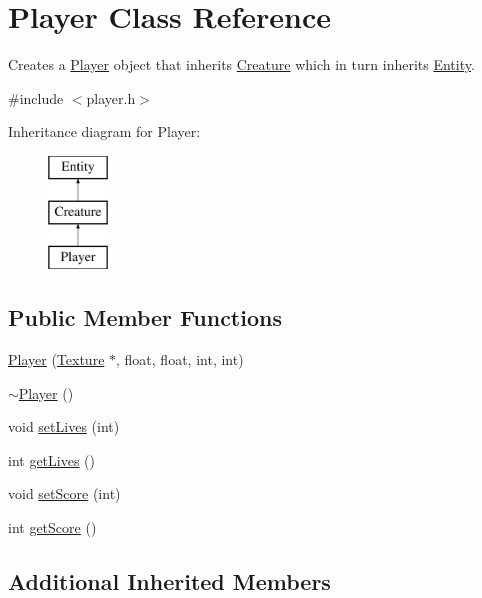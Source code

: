 \hypertarget{class_player}{\section{Player Class Reference}
\label{class_player}
}


Creates a \hyperlink{class_player}{Player} object that inherits \hyperlink{class_creature}{Creature} which in turn inherits \hyperlink{class_entity}{Entity}.  




{\ttfamily \#include $<$player.\+h$>$}

Inheritance diagram for Player\+:\begin{figure}[H]
\begin{center}
\leavevmode
\includegraphics[height=3.000000cm]{class_player}
\end{center}
\end{figure}
\subsection*{Public Member Functions}
\begin{DoxyCompactItemize}
\item 
\hyperlink{class_player_a73d9a9d1017a68d6de107bbfb0a0c486}{Player} (\hyperlink{class_texture}{Texture} $\ast$, float, float, int, int)
\item 
\hyperlink{class_player_a749d2c00e1fe0f5c2746f7505a58c062}{$\sim$\+Player} ()
\item 
void \hyperlink{class_player_a565d4df3c32d00243b1ef16dfd6e5e03}{set\+Lives} (int)
\item 
int \hyperlink{class_player_af56ac33b9b2ebd9f97c8a6f485cf2d47}{get\+Lives} ()
\item 
void \hyperlink{class_player_aa054ea95ca73dd19036d2917b29ab021}{set\+Score} (int)
\item 
int \hyperlink{class_player_a97e5447778ae6c384eedc532dcd8431d}{get\+Score} ()
\end{DoxyCompactItemize}
\subsection*{Additional Inherited Members}



